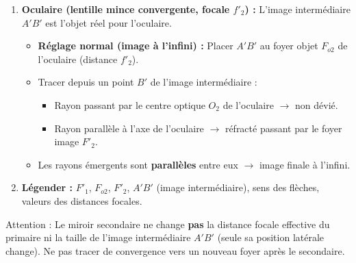 \documentclass[11pt]{article}
\newcommand{\cle}[1]{{\popxbold\color{popdark}#1}}
\begin{document}
\begin{methode}
\begin{enumerate}
    \item \textbf{Oculaire (lentille mince convergente, focale $f'_2$) :} L'image intermédiaire $A'B'$ est l'objet réel pour l'oculaire.
    \begin{itemize}
        \item \textbf{Réglage normal (image à l'infini) :} Placer $A'B'$ au foyer objet $F_{o2}$ de l'oculaire (distance $f'_2$).
        \item Tracer depuis un point $B'$ de l'image intermédiaire :
            \begin{itemize}
                \item Rayon passant par le centre optique $O_2$ de l'oculaire $\rightarrow$ non dévié.
                \item Rayon parallèle à l'axe de l'oculaire $\rightarrow$ réfracté passant par le foyer image $F'_{2}$.
            \end{itemize}
        \item Les rayons émergents sont \textbf{parallèles} entre eux $\rightarrow$ image finale à l'infini.
    \end{itemize}
    \item \textbf{Légender :} $F'_1$, $F_{o2}$, $F'_2$, $A'B'$ (image intermédiaire), sens des flèches, valeurs des distances focales.
\end{enumerate}
\cle{Attention} : Le miroir secondaire ne change \textbf{pas} la distance focale effective du primaire ni la taille de l'image intermédiaire $A'B'$ (seule sa position latérale change). Ne pas tracer de convergence vers un nouveau foyer après le secondaire.
\end{methode}
\end{document}
